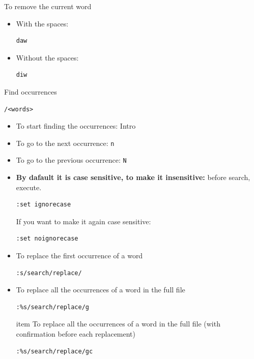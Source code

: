 \documentclass{article}
\newenvironment{blocktemplateII}[1]{%
    \tcolorbox[beamer,%
    noparskip,breakable,
    colframe=Green,%
    colbacklower=LimeGreen!75!LightGreen,%
    title=#1]}%
    {\endtcolorbox}
\newenvironment{codetemplate}[1][]{%
  \mybasecolorbox[#1]
  \itshape
}{%
  \endmybasecolorbox
}
\begin{document}
To remove the current word
\begin{itemize}
    \item With the spaces:
\begin{codetemplate}
\begin{verbatim}
daw
\end{verbatim}
\end{codetemplate}
    \item Without the spaces:
\begin{codetemplate}
\begin{verbatim}
diw
\end{verbatim}
\end{codetemplate}
\end{itemize}


Find occurrences
\begin{codetemplate}
\begin{verbatim}
/<words>
\end{verbatim}
\end{codetemplate}
\begin{itemize}
    \item To start finding the occurrences: Intro
    \item To go to the next occurrence: \verb|n|
    \item To go to the previous occurrence: \verb|N|
    \item \textbf{By dafault it is case sensitive, to make it insensitive:} before search, execute.
\begin{codetemplate}
\begin{verbatim}
:set ignorecase
\end{verbatim}
\end{codetemplate}
\begin{blocktemplateII}{NOTE}
If you want to make it again case sensitive:
\begin{codetemplate}
\begin{verbatim}
:set noignorecase
\end{verbatim}
\end{codetemplate}
\end{blocktemplateII}
    \item To replace the first occurrence of a word
\begin{codetemplate}
\begin{verbatim}
:s/search/replace/
\end{verbatim}
\end{codetemplate}
    \item To replace all the occurrences of a word in the full file
\begin{codetemplate}
\begin{verbatim}
:%s/search/replace/g
\end{verbatim}
\end{codetemplate}
    item To replace all the occurrences of a word in the full file (with confirmation before each replacement)
\begin{codetemplate}
\begin{verbatim}
:%s/search/replace/gc
\end{verbatim}
\end{codetemplate}
\end{itemize}
\end{document}

